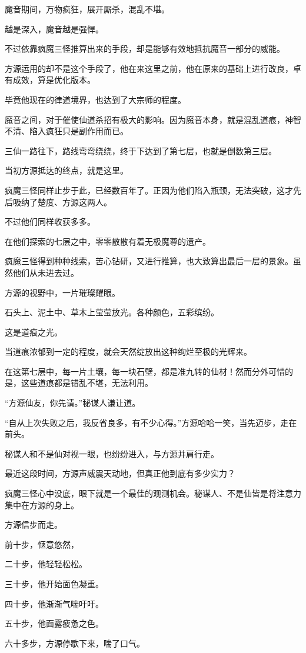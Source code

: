 \begin{this_body}
魔音期间，万物疯狂，展开厮杀，混乱不堪。

越是深入，魔音越是强悍。

不过依靠疯魔三怪推算出来的手段，却是能够有效地抵抗魔音一部分的威能。

方源运用的却不是这个手段了，他在来这里之前，他在原来的基础上进行改良，卓有成效，算是优化版本。

毕竟他现在的律道境界，也达到了大宗师的程度。

魔音之间，对于催使仙道杀招有极大的影响。因为魔音本身，就是混乱道痕，神智不清、陷入疯狂只是副作用而已。

三仙一路往下，路线弯弯绕绕，终于下达到了第七层，也就是倒数第三层。

当初方源抵达的终点，就是这里。

疯魔三怪同样止步于此，已经数百年了。正因为他们陷入瓶颈，无法突破，这才先后吸纳了楚度、方源这两人。

不过他们同样收获多多。

在他们探索的七层之中，零零散散有着无极魔尊的遗产。

疯魔三怪得到种种线索，苦心钻研，又进行推算，也大致算出最后一层的景象。虽然他们从未进去过。

方源的视野中，一片璀璨耀眼。

石头上、泥土中、草木上莹莹放光。各种颜色，五彩缤纷。

这是道痕之光。

当道痕浓郁到一定的程度，就会天然绽放出这种绚烂至极的光辉来。

在这第七层中，每一片土壤，每一块石壁，都是准九转的仙材！然而分外可惜的是，这些道痕都是错乱不堪，无法利用。

“方源仙友，你先请。”秘谋人谦让道。

“自从上次失败之后，我反省良多，有不少心得。”方源哈哈一笑，当先迈步，走在前头。

秘谋人和不是仙对视一眼，也纷纷进入，与方源并肩行走。

最近这段时间，方源声威震天动地，但真正他到底有多少实力？

疯魔三怪心中没底，眼下就是一个最佳的观测机会。秘谋人、不是仙皆是将注意力集中在方源的身上。

方源信步而走。

前十步，惬意悠然，

二十步，他轻轻松松。

三十步，他开始面色凝重。

四十步，他渐渐气喘吁吁。

五十步，他面露疲惫之色。

六十多步，方源停歇下来，喘了口气。


\end{this_body}
